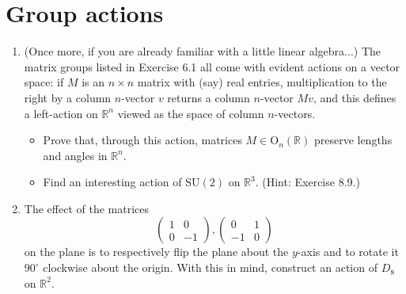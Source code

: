 \section{Group actions}
\begin{enumerate}
    \item (Once more, if you are already familiar with a little linear algebra...) The matrix groups listed in Exercise 6.1 all come with evident actions on a vector space: if $M$ is an $n \times n$ matrix with (say) real entries, multiplication to the right by a column $n$-vector $v$ returns a column $n$-vector $Mv$, and this defines a left-action on $\mathbb{R}^n$ viewed as the space of column $n$-vectors.
          \begin{itemize}
              \item Prove that, through this action, matrices $M \in \text{O}_n(\mathbb{R})$ preserve lengths and angles in $\mathbb{R}^n$.
              \item Find an interesting action of $\text{SU}(2)$ on $\mathbb{R}^3$. (Hint: Exercise 8.9.)
          \end{itemize}

    \item The effect of the matrices
          \[ \begin{pmatrix} 1 & 0 \\ 0 & -1 \end{pmatrix}, \begin{pmatrix} 0 & 1 \\ -1 & 0 \end{pmatrix} \]
          on the plane is to respectively flip the plane about the $y$-axis and to rotate it $90^\circ$ clockwise about the origin. With this in mind, construct an action of $D_8$ on $\mathbb{R}^2$.


\end{enumerate}
